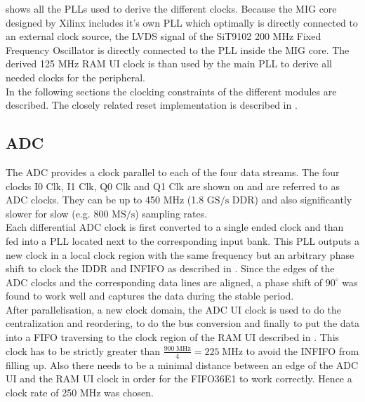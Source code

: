  shows all the \glspl{PLL} used to derive the
different clocks. Because the \gls{MIG} core designed by Xilinx includes
it's own \gls{PLL} which optimally is directly connected to an external
clock source, the \gls{LVDS} signal of the SiT9102 200 MHz Fixed Frequency
Oscillator is directly connected to the \gls{PLL} inside the \gls{MIG} core.
The derived 125 MHz \gls{RAM} \gls{UI} clock is than used by the main
\gls{PLL} to derive all needed clocks for the peripheral. \\

In the following sections the clocking constraints of the different modules
are described. The closely related reset implementation is described
in . \\

\subsection{\gls{ADC}}
The \gls{ADC} provides a clock parallel to each of the four data streams.
The four clocks I0 Clk, I1 Clk, Q0 Clk and Q1 Clk are shown on
 and are referred to as \gls{ADC} clocks.
They can be up to 450 MHz (1.8 $\text{GS}/\text{s}$ \gls{DDR})
and also significantly slower for slow (e.g. 800 $\text{MS}/\text{s}$)
sampling rates. \\

Each differential \gls{ADC} clock is first converted to a single ended
clock and than fed into a \gls{PLL} located next to the corresponding input
bank. This \gls{PLL} outputs a new clock in a local clock region
with the same frequency but an arbitrary phase shift
to clock the \gls{IDDR} and \gls{INFIFO} as described in .
Since the edges of the \gls{ADC} clocks and the corresponding data lines
are aligned, a phase shift of $90^\circ$ was found to work well and captures
the data during the stable period. \\

After parallelisation, a new clock domain, the \gls{ADC} \gls{UI} clock
is used to do the centralization and reordering,
to do the bus conversion and finally to put the data into a \gls{FIFO}
traversing to the clock region of the \gls{RAM} \gls{UI} described
in . This clock has to be strictly greater than
$\frac{900\;\text{MHz}}{4} = 225\;\text{MHz}$ to avoid the
\gls{INFIFO} from filling up. Also there needs to be a minimal
distance between an edge of the \gls{ADC} \gls{UI} and the
\gls{RAM} \gls{UI} clock in order for the FIFO36E1 to work correctly.
Hence a clock rate of 250 MHz was chosen. \\

